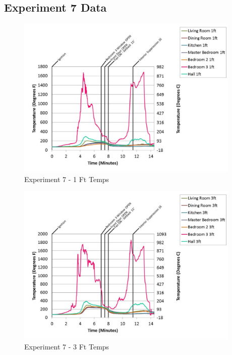 \documentclass{article}
\begin{document}
\begin{appendices}
	\clearpage

		\clearpage
\clearpage		\large
\subsection{Experiment 7 Data} \label{App:Exp7Results} 

	\begin{figure}[h!]
		\centering
		\includegraphics[height=3.05in]{0_Images/Results_Charts/Exp_7_Charts/1FtTemps.pdf}
		\caption{Experiment 7 - 1 Ft Temps}
	\end{figure}
 

	\begin{figure}[h!]
		\centering
		\includegraphics[height=3.05in]{0_Images/Results_Charts/Exp_7_Charts/3FtTemps.pdf}
		\caption{Experiment 7 - 3 Ft Temps}
	\end{figure}
 
	\clearpage


\end{appendices}
\end{document}
